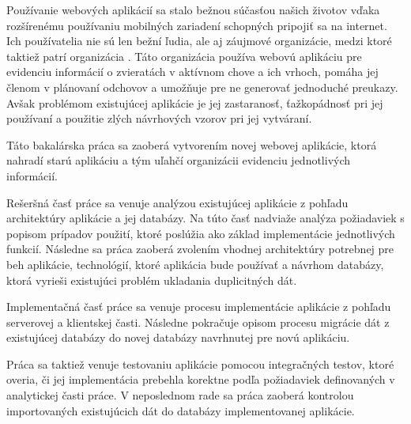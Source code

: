 \begin{introduction}

Používanie webových aplikácií sa stalo bežnou súčasťou našich životov vďaka rozšírenému používaniu mobilných zariadení schopných pripojiť sa na internet. Ich používatelia nie sú len bežní ľudia, ale aj záujmové organizácie, medzi ktoré taktiež patrí organizácia . Táto organizácia používa webovú aplikáciu pre evidenciu informácií o zvieratách v aktívnom chove a ich vrhoch, pomáha jej členom v plánovaní odchovov a umožňuje pre ne generovať jednoduché preukazy. Avšak problémom existujúcej aplikácie je jej zastaranosť, ťažkopádnosť pri jej používaní a použitie zlých návrhových vzorov pri jej vytváraní.

Táto bakalárska práca sa zaoberá vytvorením novej webovej aplikácie, ktorá nahradí starú aplikáciu a tým uľahčí organizácii evidenciu jednotlivých informácií.

Rešeršná časť práce sa venuje analýzou existujúcej aplikácie z pohľadu architektúry aplikácie a jej databázy. Na túto časť nadviaže analýza požiadaviek s popisom prípadov použití, ktoré poslúžia ako základ implementácie jednotlivých funkcií.
Následne sa práca zaoberá zvolením vhodnej architektúry potrebnej pre beh aplikácie, technológií, ktoré aplikácia bude používať a návrhom databázy, ktorá vyrieši existujúci problém ukladania duplicitných dát.

Implementačná časť práce sa venuje procesu implementácie aplikácie z pohľadu serverovej a klientskej časti. Následne pokračuje opisom procesu migrácie dát z existujúcej databázy do novej databázy navrhnutej pre novú aplikáciu.

\pagebreak

Práca sa taktiež venuje testovaniu aplikácie pomocou integračných testov, ktoré overia, či jej implementácia prebehla korektne podľa požiadaviek definovaných v analytickej časti práce. V neposlednom rade sa práca zaoberá kontrolou importovaných existujúcich dát do databázy implementovanej aplikácie.

\end{introduction}
